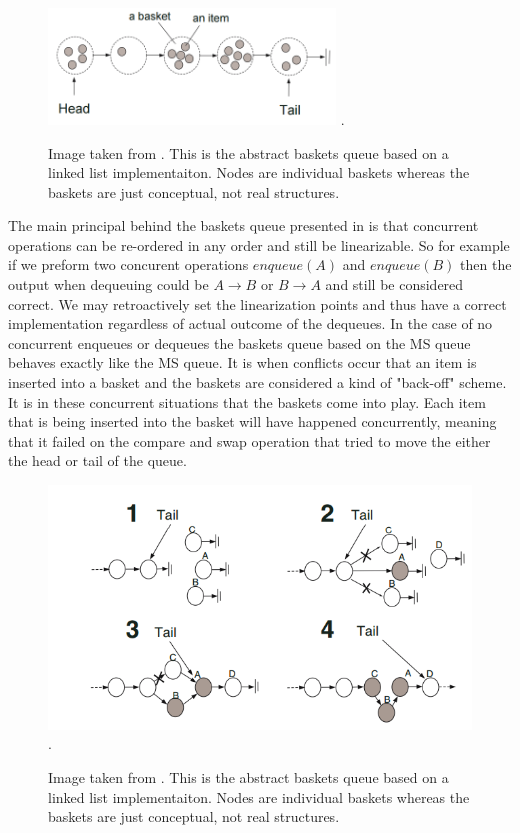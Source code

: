 \documentclass[conference]{IEEEtran}
\begin{document}
\begin{figure}[!h]
\centering
\includegraphics[width=3in]{abstractBasket}
\DeclareGraphicsExtensions.
\caption{Image taken from \cite{baskets}.  This is the abstract baskets queue based on a linked list implementaiton.  Nodes are individual baskets whereas the baskets are just conceptual, not real structures. }
\label{fig_sim}
\end{figure}

The main principal behind the baskets queue presented in \cite{baskets} is that concurrent operations can be re-ordered in any order and still be linearizable.  So for example if we preform two concurent operations \(enqueue(A)\) and \(enqueue(B)\) then the output when dequeuing could be \(A\rightarrow B\) or \(B\rightarrow A\) and still be considered correct.  We may retroactively set the linearization points and thus have a correct implementation regardless of actual outcome of the dequeues.
\break
In the case of no concurrent enqueues or dequeues the baskets queue based on the MS queue behaves exactly like the MS queue.  It is when conflicts occur that an item is inserted into a basket and the baskets are considered a kind of "back-off" scheme.  It is in these concurrent situations that the baskets come into play.
Each item that is being inserted into the basket will have happened concurrently, meaning that it failed on the compare and swap operation that tried to move the either the head or tail of the queue.  

\begin{figure}[!tp]
\centering
\includegraphics[width=5in]{basketsInsert}
\DeclareGraphicsExtensions.
\caption{Image taken from \cite{baskets}.  This is the abstract baskets queue based on a linked list implementaiton.  Nodes are individual baskets whereas the baskets are just conceptual, not real structures. }
\label{fig_sim}
\end{figure}
\end{document}
